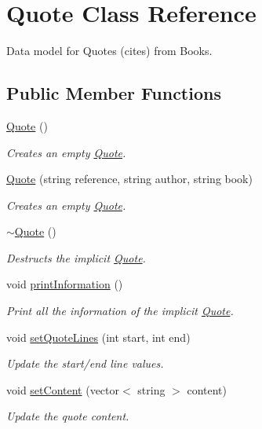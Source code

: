 \hypertarget{class_quote}{\section{Quote Class Reference}
\label{class_quote}
}


Data model for Quotes (cites) from Books.  


\subsection*{Public Member Functions}
\begin{DoxyCompactItemize}
\item 
\hyperlink{class_quote_ae160077e513fe6346eeba294a195038b}{Quote} ()
\begin{DoxyCompactList}\small\item\em Creates an empty \hyperlink{class_quote}{Quote}. \end{DoxyCompactList}\item 
\hyperlink{class_quote_a12fee26be3fcdf003691e394f256b2c8}{Quote} (string reference, string author, string book)
\begin{DoxyCompactList}\small\item\em Creates an empty \hyperlink{class_quote}{Quote}. \end{DoxyCompactList}\item 
\hyperlink{class_quote_a9b4324f3ee83827f2445177c8301482b}{$\sim$\+Quote} ()
\begin{DoxyCompactList}\small\item\em Destructs the implicit \hyperlink{class_quote}{Quote}. \end{DoxyCompactList}\item 
void \hyperlink{class_quote_a460613985a5f9540850b0f840f013e8e}{print\+Information} ()
\begin{DoxyCompactList}\small\item\em Print all the information of the implicit \hyperlink{class_quote}{Quote}. \end{DoxyCompactList}\item 
void \hyperlink{class_quote_a211e2593b1ef18dc7fd4a5da87384fa1}{set\+Quote\+Lines} (int start, int end)
\begin{DoxyCompactList}\small\item\em Update the start/end line values. \end{DoxyCompactList}\item 
void \hyperlink{class_quote_ab3af36f8b5649b115fca7eecbb294a59}{set\+Content} (vector$<$ string $>$ content)
\begin{DoxyCompactList}\small\item\em Update the quote content. \end{DoxyCompactList}\end{DoxyCompactItemize}
